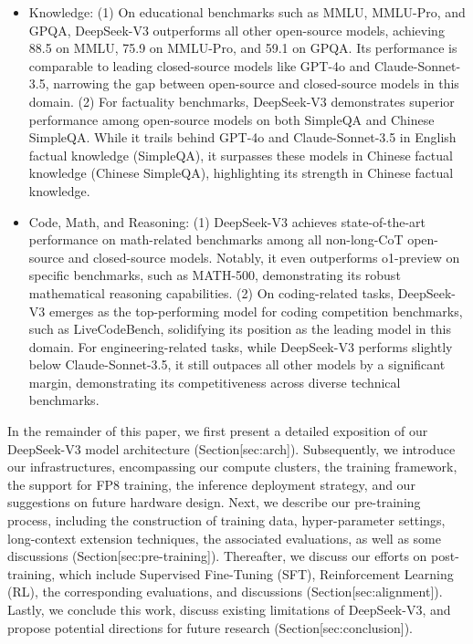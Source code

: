 \documentclass[11pt,a4paper]{article}
\begin{document}
\begin{itemize}
\item Knowledge:
    (1) 
    On educational benchmarks such as MMLU, MMLU-Pro, and GPQA, DeepSeek-V3 outperforms all other open-source models, achieving 88.5 on MMLU, 75.9 on MMLU-Pro, and 59.1 on GPQA.
    Its performance is comparable to leading closed-source models like GPT-4o and Claude-Sonnet-3.5, narrowing the gap between open-source and closed-source models in this domain.
    (2)
    For factuality benchmarks, DeepSeek-V3 demonstrates superior performance among open-source models on both SimpleQA and Chinese SimpleQA. 
    While it trails behind GPT-4o and Claude-Sonnet-3.5 in English factual knowledge (SimpleQA), it surpasses these models in Chinese factual knowledge (Chinese SimpleQA), highlighting its strength in Chinese factual knowledge.
\item Code, Math, and Reasoning: 
    (1)
    DeepSeek-V3 achieves state-of-the-art performance on math-related benchmarks among all non-long-CoT open-source and closed-source models. 
    Notably, it even outperforms o1-preview on specific benchmarks, such as MATH-500, demonstrating its robust mathematical reasoning capabilities. 
    (2)
    On coding-related tasks, DeepSeek-V3 emerges as the top-performing model for coding competition benchmarks, such as LiveCodeBench, solidifying its position as the leading model in this domain. 
    For engineering-related tasks, while DeepSeek-V3 performs slightly below Claude-Sonnet-3.5, it still outpaces all other models by a significant margin, demonstrating its competitiveness across diverse technical benchmarks.
\end{itemize}

In the remainder of this paper, we first present a detailed exposition of our DeepSeek-V3 model architecture (Section[sec:arch]). 
Subsequently, we introduce our infrastructures, encompassing our compute clusters, the training framework, the support for FP8 training, the inference deployment strategy, and our suggestions on future hardware design.
Next, we describe our pre-training process, including the construction of training data, hyper-parameter settings, long-context extension techniques, the associated evaluations, as well as some discussions (Section[sec:pre-training]). 
Thereafter, we discuss our efforts on post-training, which include Supervised Fine-Tuning (SFT), Reinforcement Learning (RL), the corresponding evaluations, and discussions (Section[sec:alignment]). 
Lastly, we conclude this work, discuss existing limitations of DeepSeek-V3, and propose potential directions for future research (Section[sec:conclusion]).
\end{document}
